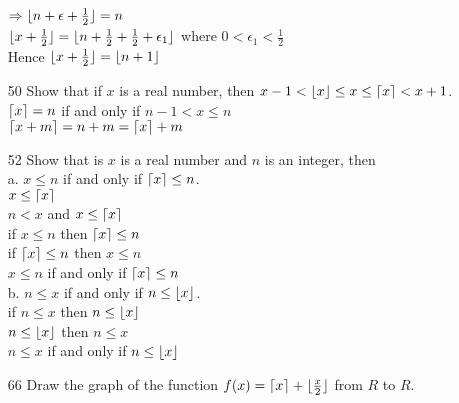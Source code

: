 \documentclass[a4paper]{article}
\newcommand\tab[1][0.5cm]{\hspace*{#1}}
\DeclarePairedDelimiter\ceil{\lceil}{\rceil}
\DeclarePairedDelimiter\floor{\lfloor}{\rfloor}
\begin{document}
\begin{itemize}
    \tab $\Rightarrow \floor{n + \epsilon + \frac{1}{2}} = n$ \\
    \tab $\floor{x + \frac{1}{2}} = \floor{n + \frac{1}{2} + \frac{1}{2} + \epsilon_1}$ where $0 < \epsilon_1 < \frac{1}{2}$ \\
    \tab Hence $\floor{x + \frac{1}{2}} = \floor{n + 1}$
    \item[50] Show that if $x$ is a real number, then $x - 1 < \floor{x} \leq x \leq \ceil{x} < x + 1$. \\
    \tab $\ceil{x} = n$ if and only if $n - 1 < x \leq n$ \\
    \tab $\ceil{x + m} = n + m = \ceil{x} + m$
    \item[52] Show that is $x$ is a real number and $n$ is an integer, then \\
      a. $x \leq n$ if and only if $\ceil{x} \leq n$. \\
      \tab $x \leq \ceil{x}$ \\
      \tab $n < x$ and $x \leq \ceil{x}$ \\
      \tab if $x \leq n$ then $\ceil{x} \leq n$ \\
      \tab if $\ceil{x} \leq n$ then $x \leq n$ \\
      \tab $x \leq n$ if and only if $\ceil{x} \leq n$ \\
      b. $n \leq x$ if and only if $n \leq \floor{x}$. \\
      \tab if $n \leq x$ then $n \leq \floor{x}$ \\
      \tab $n \leq \floor{x}$ then $n \leq x$ \\
      \tab $n \leq x$ if and only if $n \leq \floor{x}$
    \item[66] Draw the graph of the function $f(x) = \ceil{x} + \floor{\frac{x}{2}}$ from $R$ to $R$. \\
  \end{itemize}

  
\end{document}
